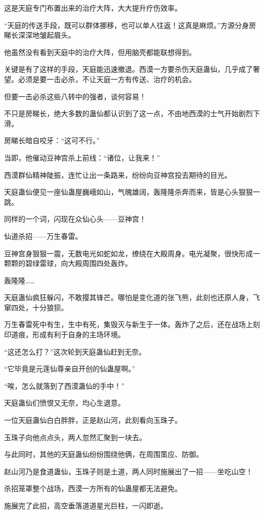 \begin{this_body}
这是天庭专门布置出来的治疗大阵，大大提升疗伤效率。

“天庭的传送手段，既可以群体挪移，也可以单人往返！这真是麻烦。”方源分身房睇长深深地皱起眉头。

他虽然没有看到天庭中的治疗大阵，但用脑壳都能联想得到。

关键是有了这样的手段，天庭能迅速撤退。西漠一方要杀伤天庭蛊仙，几乎成了奢望。必须是要一击必杀，不让天庭一方有传送、治疗的机会。

但要一击必杀这些八转中的强者，谈何容易！

不只是房睇长，绝大多数的蛊仙都认识到了这一点，不由地西漠的士气开始剧烈下滑。

房睇长暗自咬牙：“这可不行。”

当即，他催动豆神宫杀上前线：“诸位，让我来！”

西漠群仙精神陡振，连忙让出一条路来，纷纷向豆神宫投去期待的目光。

天庭蛊仙便见一座仙蛊屋巍峨如山，气魄雄阔，轰隆隆杀奔而来，皆是心头狠狠一跳。

同样的一个词，闪现在众仙心头——豆神宫！

仙道杀招——万生春雷。

豆神宫身狠狠一震，无数电光如蛇如龙，缭绕在大殿周身。电光凝聚，很快形成一颗颗的碧绿雷球，向大殿周围四处轰炸。

轰隆隆……

天庭蛊仙疯狂躲闪，不敢撄其锋芒。哪怕是变化道的张飞熊，此刻也还原人身，飞窜四处，十分狼狈。

万生春雷死中有生，生中有死，集毁灭与新生于一体。轰炸了之后，还在战场上刻印道痕，形成有利于自身的主场环境。

“这还怎么打？”这次轮到天庭蛊仙赶到无奈。

“它毕竟是元莲仙尊亲自开创的仙蛊屋啊。”

“唉，怎么就落到了西漠蛊仙的手中！”

天庭蛊仙们愤恨又无奈，均心生退意。

一位天庭蛊仙白白胖胖，正是赵山河，此刻看向玉珠子。

玉珠子向他点点头，两人忽然汇聚到一块去。

与此同时，其他的天庭蛊仙纷纷围绕他俩，在周围策应、防御。

赵山河乃是食道蛊仙，玉珠子则是土道，两人同时施展出了一招——坐吃山空！

杀招笼罩整个战场，西漠一方所有的仙蛊屋都无法避免。

施展完了此招，高空垂落道道星光巨柱，一闪即逝。


\end{this_body}
